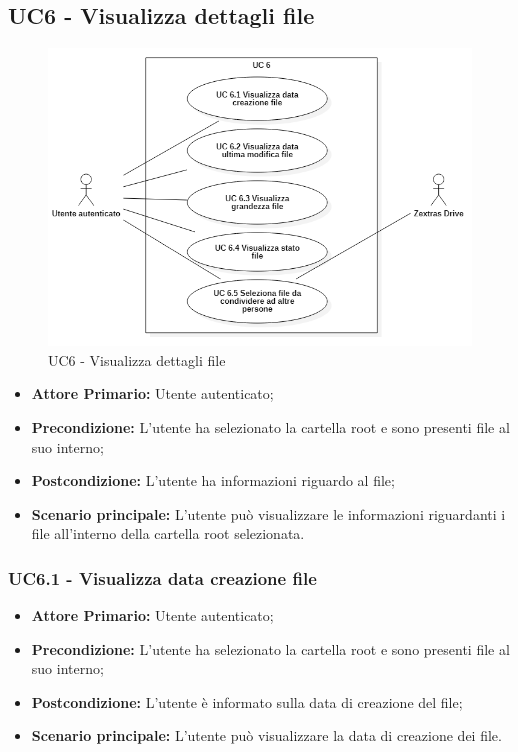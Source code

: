 \subsection{UC6 - Visualizza dettagli file}
\label{UC6}
\begin{figure}[H]
    \centering
    \includegraphics[scale = 0.7]{components/img/UC6.png}
    \caption{UC6 - Visualizza dettagli file}
\end{figure}
\begin{itemize}
\item \textbf{Attore Primario:} Utente autenticato;
\item \textbf{Precondizione:} L'utente ha selezionato la cartella root e sono presenti file al suo interno;
\item \textbf{Postcondizione:} L'utente ha informazioni riguardo al file;
\item \textbf{Scenario principale:} L'utente può visualizzare le informazioni riguardanti i file all'interno della cartella root selezionata.
\end{itemize}

\subsubsection{UC6.1 - Visualizza data creazione file}
\label{UC6.1}
\begin{itemize}
\item \textbf{Attore Primario:} Utente autenticato;
\item \textbf{Precondizione:} L'utente ha selezionato la cartella root e sono presenti file al suo interno;
\item \textbf{Postcondizione:} L'utente è informato sulla data di creazione del file;
\item \textbf{Scenario principale:} L'utente può visualizzare la data di creazione dei file.
\end{itemize}


